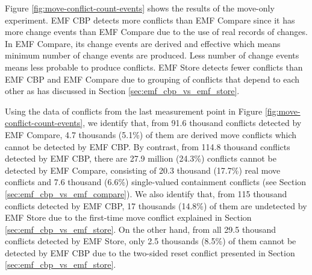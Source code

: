%
%
%
%
%


Figure \ref{fig:move-conflict-count-events} shows the results of the move-only experiment. EMF CBP detects more conflicts than EMF Compare since it has more change events than EMF Compare due to the use of real records of changes. In EMF Compare, its change events are derived and effective which means minimum number of change events are produced. Less number of change events means less probable to produce conflicts. EMF Store detects fewer conflicts than EMF CBP and EMF Compare due to grouping of conflicts that depend to each other as has discussed in Section \ref{sec:emf_cbp_vs_emf_store}.

Using the data of conflicts from the last measurement point in Figure \ref{fig:move-conflict-count-events}, we identify that, from 91.6 thousand conflicts detected by EMF Compare, 4.7 thousands (5.1\%) of them are derived move conflicts which cannot be detected by EMF CBP. By contrast, from 114.8 thousand conflicts detected by EMF CBP, there are 27.9 million (24.3\%) conflicts cannot be detected by EMF Compare, consisting of 20.3 thousand (17.7\%) real move conflicts and 7.6 thousand (6.6\%) single-valued containment conflicts (see Section \ref{sec:emf_cbp_vs_emf_compare}). We also identify that, from 115 thousand conflicts detected by EMF CBP, 17 thousands (14.8\%) of them are undetected by EMF Store due to the first-time move conflict explained in Section \ref{sec:emf_cbp_vs_emf_store}. On the other hand, from all 29.5 thousand conflicts detected by EMF Store, only 2.5 thousands (8.5\%) of them cannot be detected by EMF CBP due to the two-sided reset conflict presented in Section \ref{sec:emf_cbp_vs_emf_store}.

